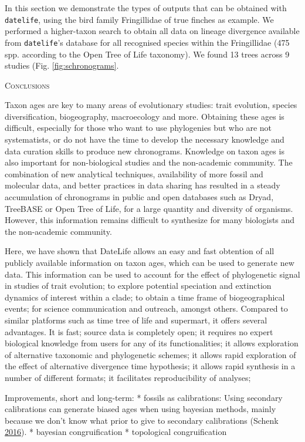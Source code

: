 \documentclass[]{article}
\begin{document}
In this section we demonstrate the types of outputs that can be obtained with \texttt{datelife}, using the bird family Fringillidae of true finches as example. We performed a higher-taxon search to obtain all data on lineage divergence available from \texttt{datelife}'s database for all recognised species within the Fringillidae (475 spp. according to the Open Tree of Life taxonomy). We found 13 trees across 9 studies (Fig. \ref{fig:schronograms}.

\begin{center}
\textsc{Conclusions}
\end{center}

Taxon ages are key to many areas of evolutionary studies: trait evolution, species
diversification, biogeography, macroecology and more. Obtaining these ages is difficult,
especially for those who want to use phylogenies but who are not systematists, or
do not have the time to develop the necessary knowledge and data curation skills
to produce new chronograms. Knowledge on taxon ages is also important for non-biological
studies and the non-academic community.
The combination of new analytical techniques, availability of more fossil and molecular
data, and better practices in data sharing has resulted in a steady accumulation
of chronograms in public and open databases such as Dryad, TreeBASE or Open Tree
of Life, for a large quantity and diversity of organisms. However, this information
remains difficult to synthesize for many biologists and the non-academic community.

Here, we have shown that DateLife allows
an easy and fast obtention of all publicly available information on taxon ages,
which can be used to generate new data.
This information can be used to account for the effect of phylogenetic signal in
studies of trait evolution; to explore potential speciation and extinction dynamics
of interest within a clade; to obtain a time frame of biogeographical events; for
science communication and outreach, amongst others.
Compared to similar platforms such as time tree of life
and supermart, it offers several advantages.
It is fast;
source data is completely open;
it requires no expert biological knowledge from users for any of its functionalities;
it allows exploration of alternative taxonomic and phylogenetic schemes;
it allows rapid exploration of the effect of alternative divergence time hypothesis;
it allows rapid synthesis in a number of different formats;
it facilitates reproducibility of analyses;

Improvements, short and long-term:
* fossils as calibrations: Using secondary calibrations can generate biased ages when using bayesian methods, mainly because we don't know what prior to give to secondary calibrations
(Schenk \protect\hyperlink{ref-Schenk2016}{2016}).
* bayesian congruification
* topological congruification
\end{document}
